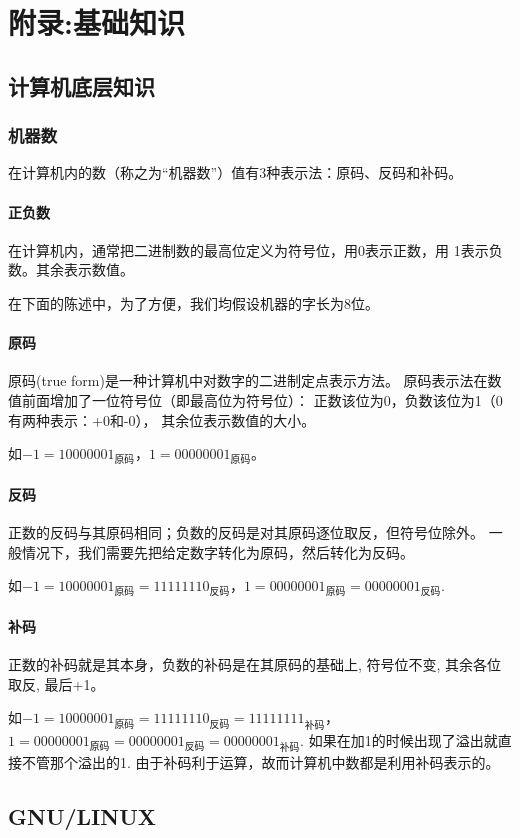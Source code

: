 \chapter{附录:基础知识}

\minitoc
	\section{计算机底层知识}
		\subsection{机器数}
			在计算机内的数（称之为“机器数”）值有3种表示法：原码、反码和补码。
			\subsubsection{正负数}
				在计算机内，通常把二进制数的最高位定义为符号位，用0表示正数，用
				1表示负数。其余表示数值。
				
				在下面的陈述中，为了方便，我们均假设机器的字长为8位。
			\subsubsection{原码}
				原码(true form)是一种计算机中对数字的二进制定点表示方法。
				原码表示法在数值前面增加了一位符号位（即最高位为符号位）：
				正数该位为0，负数该位为1（0有两种表示：+0和-0），
				其余位表示数值的大小。
				
				如$-1=10000001_{原码}$，$1=00000001_{原码}$。
			\subsubsection{反码}
				正数的反码与其原码相同；负数的反码是对其原码逐位取反，但符号位除外。
				一般情况下，我们需要先把给定数字转化为原码，然后转化为反码。

				如$-1=10000001_{原码}=11111110_{反码}$，$1=00000001_{原码}=00000001_{反码}$.

			\subsubsection{补码}
				正数的补码就是其本身，负数的补码是在其原码的基础上, 符号位不变, 其余各位取反, 最后+1。
				
				如$-1=10000001_{原码}=11111110_{反码}=11111111_{补码}$，$1=00000001_{原码}=00000001_{反码}=00000001_{补码}$.
				如果在加1的时候出现了溢出就直接不管那个溢出的1.				
				由于补码利于运算，故而计算机中数都是利用补码表示的。
	\section{GNU/LINUX}
